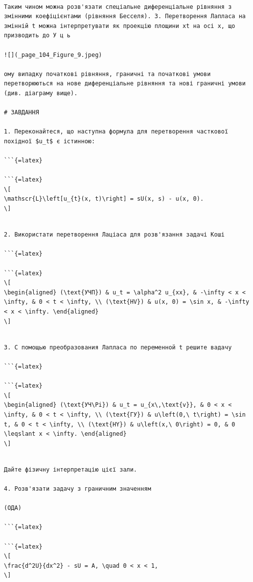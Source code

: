 \documentclass[
]{article}
\begin{document}
\begin{verbatim}

Таким чином можна розв'язати спеціальне диференціальне рівняння з змінними коефіцієнтами (рівняння Бесселя). 3. Перетворення Лапласа на змінній t можна інтерпретувати як проекцію площини xt на осі x, що призводить до У ц ь

![](_page_104_Figure_9.jpeg)

ому випадку початкові рівняння, граничні та початкові умови перетворюються на нове диференціальне рівняння та нові граничні умови (див. діаграму вище).

# ЗАВДАННЯ

1. Переконайтеся, що наступна формула для перетворення часткової похідної $u_t$ є істинною:

```{=latex}

```{=latex}
\[
\mathscr{L}\left[u_{t}(x, t)\right] = sU(x, s) - u(x, 0).
\]
\end{verbatim}

\begin{verbatim}

2. Використати перетворення Лаціаса для розв'язання задачі Коші

```{=latex}

```{=latex}
\[
\begin{aligned} (\text{УЧП}) & u_t = \alpha^2 u_{xx}, & -\infty < x < \infty, & 0 < t < \infty, \\ (\text{HV}) & u(x, 0) = \sin x, & -\infty < x < \infty. \end{aligned}
\]
\end{verbatim}

\begin{verbatim}

3. С помощью преобразования Лапласа по переменной t решите вадачу

```{=latex}

```{=latex}
\[
\begin{aligned} (\text{УЧ\Pi}) & u_t = u_{x\,\text{v}}, & 0 < x < \infty, & 0 < t < \infty, \\ (\text{ГУ}) & u\left(0,\ t\right) = \sin t, & 0 < t < \infty, \\ (\text{HY}) & u\left(x,\ 0\right) = 0, & 0 \leqslant x < \infty. \end{aligned}
\]
\end{verbatim}

\begin{verbatim}

Дайте фізичну інтерпретацію цієї зали.

4. Розв'язати задачу з граничним значенням

(ОДА)

```{=latex}

```{=latex}
\[
\frac{d^2U}{dx^2} - sU = A, \quad 0 < x < 1,
\]
\end{verbatim}
\end{document}
